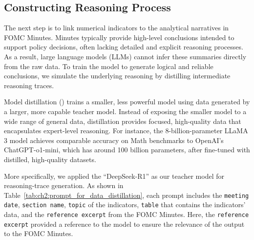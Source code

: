 \subsection*{Constructing Reasoning Process}



The next step is to link numerical indicators to the analytical narratives in FOMC Minutes. Minutes typically provide high-level conclusions intended to support policy decisions, often lacking detailed and explicit reasoning processes. As a result, large language models (LLMs) cannot infer these summaries directly from the raw data. To train the model to generate logical and reliable conclusions, we simulate the underlying reasoning by distilling intermediate reasoning traces.



Model distillation (\cite{hinton2015distilling}) trains a smaller, less powerful model using data generated by a larger, more capable teacher model. Instead of exposing the smaller model to a wide range of general data, distillation provides focused, high-quality data that encapsulates expert-level reasoning. For instance, the 8-billion-parameter LLaMA 3 model achieves comparable accuracy on Math benchmarks to OpenAI's ChatGPT-o1-mini, which has around 100 billion parameters, after fine-tuned with distilled, high-quality datasets.



More specifically, we applied the ``DeepSeek-R1'' as our teacher model for reasoning-trace generation. As shown in Table~\ref{tab:ch2:prompt_for_data_distillation}, each prompt includes the \texttt{meeting date}, \texttt{section name}, \texttt{topic} of the indicators, \texttt{table} that contains the indicators' data, and the \texttt{reference excerpt} from the FOMC Minutes. Here, the \texttt{reference excerpt} provided a reference to the model to ensure the relevance of the output to the FOMC Minutes.



